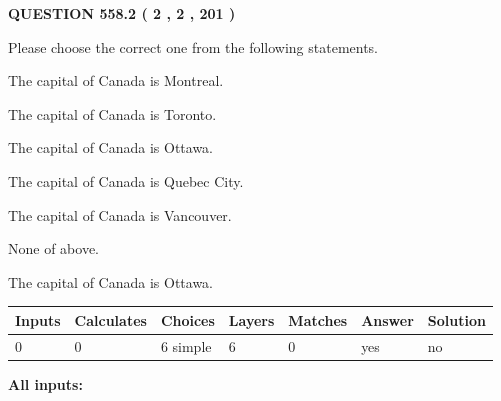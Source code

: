 \documentclass[12pt]{article}
\begin{document}
   
  
\vspace{0.2in}
  
{\textbf{\Large{QUESTION
558.2 
 ( 2 , 2 , 201 )
}}}
  
  
Please choose the correct one from the following statements.
 
 
The capital of Canada is Montreal.
 
 
The capital of Canada is Toronto.
 
 
The capital of Canada is Ottawa.
 
 
The capital of Canada is Quebec City.
 
 
The capital of Canada is Vancouver.
 
 
 None of above.
 
 
\noindent{}
 
 
The capital of Canada is Ottawa.
 
 
\noindent{}
 
 
   
   
   
   
\noindent\begin{tabular}{|l|l|l|l|l|l|l|}
 \hline
Inputs & Calculates & Choices & Layers & Matches & Answer & Solution \\ \hline
 0  & 
 0  & 
 6
  simple  
  & 
 6  & 
 0  & 
  yes & 
  no 
  \\ \hline
 \end{tabular}
   
   
   
   
\noindent{}
   
   
   
   
\noindent\vspace{0.1in}\hspace{-0.08in} {\textbf{\Large{All inputs: }}}
   
   
   
   
   
   
 \vspace{0.2in}
 
   
   
\end{document}
